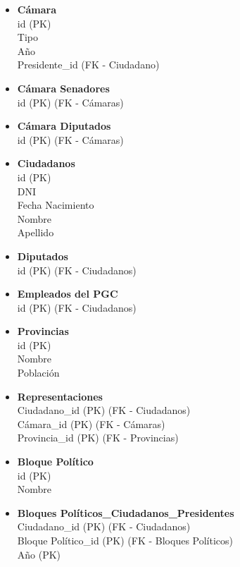 \begin{itemize}
	\item \textbf{Cámara} \\
	id (PK) \\
	Tipo \\
	Año \\
	Presidente\_id (FK - Ciudadano)
	
	\item \textbf{Cámara Senadores} \\
	id (PK) (FK - Cámaras) 
	
	\item \textbf{Cámara Diputados} \\
	id (PK) (FK - Cámaras)
	
	\item \textbf{Ciudadanos} \\
	id (PK) \\
	DNI \\
	Fecha Nacimiento \\
	Nombre \\
	Apellido
	
	\item \textbf{Diputados} \\
	id (PK) (FK - Ciudadanos)
	
	\item \textbf{Empleados del PGC} \\
	id (PK) (FK - Ciudadanos)
	
	\item \textbf{Provincias} \\
	id (PK) \\
	Nombre \\
	Población
	
	\item \textbf{Representaciones} \\
	Ciudadano\_id (PK) (FK - Ciudadanos) \\
	Cámara\_id (PK) (FK - Cámaras) \\
	Provincia\_id (PK) (FK - Provincias) 
		
	\item \textbf{Bloque Político} \\
	id (PK) \\
	Nombre
	
	\item \textbf{Bloques Políticos\_Ciudadanos\_Presidentes} \\
	Ciudadano\_id (PK) (FK - Ciudadanos) \\
	Bloque Político\_id (PK) (FK - Bloques Políticos)\\
	Año (PK)
	

\end{itemize}
